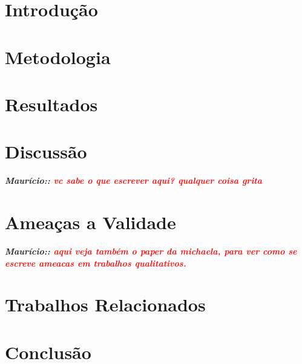 \documentclass[sigconf]{acmart}
\newcommand{\remark}[2]{{\small\textsl{\textbf{#1: #2}}}}
\newcommand{\mau}[1]{\remark{Maurício:}{\textcolor{red}{#1}}}
\begin{document}




\maketitle

\section{Introdu\c{c}\~ao}


\section{Metodologia}


\section{Resultados}



\section{Discuss\~ao}

\mau{vc sabe o que escrever aqui? qualquer coisa grita}


\section{Amea\c{c}as a Validade}

\mau{aqui veja também o paper da michaela, para ver como se escreve ameacas em trabalhos qualitativos.}


\section{Trabalhos Relacionados}


\section{Conclus\~ao}


% 


 
\end{document}
